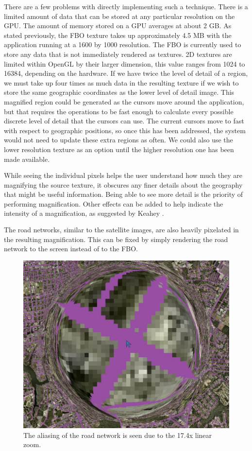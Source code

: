 There are a few problems with directly implementing such a technique. There is a limited amount of data that can be stored at any particular resolution on the GPU\@. The amount of memory stored on a GPU averages at about 2 GB\@. As stated previously, the FBO texture takes up approximately 4.5 MB with the application running at a 1600 by 1000 resolution. The FBO is currently used to store any data that is not immediately rendered as textures. 2D textures are limited within OpenGL by their
larger dimension, this value ranges from 1024 to 16384, depending on the hardware. If we have twice the level of detail of a region, we must take up four times as much data in the resulting texture if we wish to store the same geographic coordinates as the lower level of detail image. This magnified region could be generated as the cursors move around the application, but that requires the operations to be fast enough
to calculate every possible discrete level of detail that the cursors can use. The current cursors move to fast with respect to geographic positions, so once this has been addressed, the system would not need to update these extra regions as often. We could also use the lower resolution texture as an option until the higher resolution one has been made available.

While seeing the individual pixels helps the user understand how much they are magnifying the source texture, it obscures any finer details about the geography that might be useful information. Being able to see more detail is the priority of performing magnification. Other effects can be added to help indicate the intensity of a magnification, as suggested by Keahey \cite{Keahey1998}.

The road networks, similar to the satellite images, are also heavily pixelated in the resulting magnification. This can be fixed by simply rendering the road network to the screen instead of to the FBO. 

\begin{figure} \centering
    \includegraphics[width=0.50\linewidth]{img/aliasing_clip.jpg}
    \caption[Road Network Artifacts]{The aliasing of the road network is seen due to the 17.4x linear zoom.}
    \label{fig:aliasing_clipped}
\end{figure}

